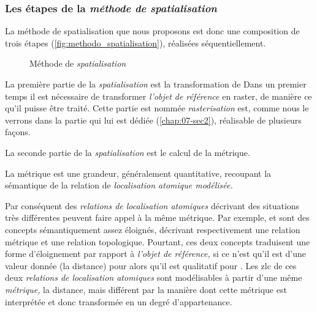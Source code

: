 \subsubsection{Les étapes de la \emph{méthode de spatialisation}}


La méthode de spatialisation que nous proposons est donc une composition de trois étapes (\autoref{fig:methodo_spatialisation}), réalisées séquentiellement.

\begin{figure}
  \centering
  
  \caption{Méthode de \emph{spatialisation}}
  \label{fig:methodo_spatialisation}
\end{figure}

%
La première partie de la \emph{spatialisation} est la transformation de 
Dans un premier temps il est nécessaire de transformer \emph{l'objet de référence} en raster, de manière ce qu'il puisse être traité. Cette partie est nommée \emph{rasterisation} est, comme nous le verrons dans la partie qui lui est dédiée (\autoref{chap:07-sec2}), réalisable de plusieurs façons.

%
La seconde partie de la \emph{spatialisation} est le calcul de la métrique.

La métrique est une grandeur, généralement quantitative, recoupant la sémantique de la relation de \emph{localisation atomique modélisée.}

Par conséquent des \emph{relations de localisation atomiques} décrivant des situations très différentes peuvent faire appel à la même métrique.
%
Par exemple,  et  sont des concepts sémantiquement assez éloignés, décrivant respectivement une relation métrique et une relation topologique. Pourtant, ces deux concepts traduisent une forme d'éloignement par rapport à \emph{l'objet de référence,} si ce n'est qu'il est d'une valeur donnée (\ie la distance) pour  alors qu'il est qualitatif pour . Les \ac{zlc} de ces deux \emph{relations de localisation atomiques} sont modélisables à partir d'une même \emph{métrique,} la distance, mais différent par la manière dont cette métrique est interprétée et donc transformée en un degré d'appartenance.


